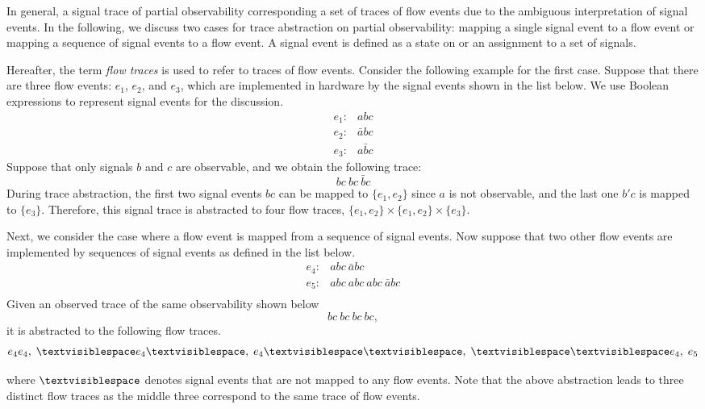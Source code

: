 \documentclass[conference]{IEEEtran}
\begin{document}
In general, a signal trace of partial observability
corresponding a set of traces of flow events due to the
ambiguous interpretation of signal events.  In the
following, we discuss two cases for trace abstraction on
partial observability: mapping a single signal event to a
flow event or mapping a sequence of signal events to a flow
event.  A signal event is defined as a state on or an
assignment to a set of signals.

Hereafter, the term {\em flow traces} is used to refer to
traces of flow events.  Consider the following example for
the first case.  Suppose that there are three flow events:
$e_1$, $e_2$, and $e_3$, which are implemented in hardware
by the signal events shown in the list below.  We use
Boolean expressions to represent signal events for the
discussion.
\[
\begin{array}{cl}
e_1: & abc\\
e_2: & \bar{a}bc\\
e_3: & a\bar{b}c
\end{array}
\] 
Suppose that only signals $b$ and $c$ are observable, and we
obtain the following trace:
\[
bc\ bc \ \bar{b}c
\]
During trace abstraction, the first two signal events $bc$
can be mapped to $\{e_1, e_2\}$ since $a$ is not observable,
and the last one $b'c$ is mapped to $\{e_3\}$.  Therefore,
this signal trace is abstracted to four flow traces, $\{e_1,
e_2\} \times \{e_1, e_2\} \times \{e_3\}$.

Next, we consider the case where a flow event is mapped from
a sequence of signal events.  Now suppose that two other
flow events are implemented by sequences of signal events as
defined in the list below.
\[
\begin{array}{cl}
e_4: & abc\ \bar{a}bc\\
e_5: & abc\ abc\ abc\ \bar{a}bc\\
\end{array}
\] 
Given an observed trace of the same observability shown below
\[
bc\ bc\ bc \ bc,
\]
it is abstracted to the following flow traces.
\[
e_4e_4,\; \textvisiblespace e_4 \textvisiblespace,\;  e_4 \textvisiblespace \textvisiblespace,\;  \textvisiblespace \textvisiblespace e_4, \; e_5
\] 

where $\textvisiblespace$ denotes signal events that are not
mapped to any flow events.  Note that the above abstraction
leads to three distinct flow traces as the middle three
correspond to the same trace of flow events.
\end{document}
